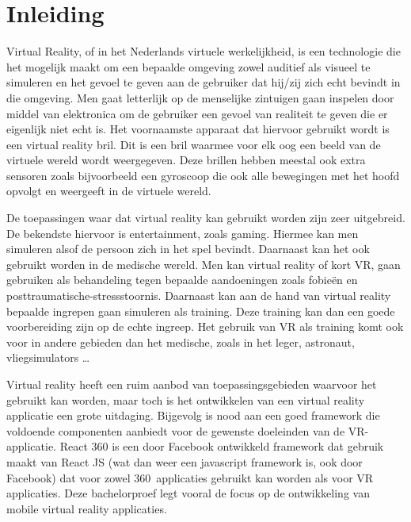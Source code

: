 
\chapter{Inleiding}
\label{ch:inleiding}
Virtual Reality, of in het Nederlands virtuele werkelijkheid, is een technologie die het mogelijk maakt om een bepaalde omgeving zowel auditief als visueel te simuleren en het gevoel te geven aan de gebruiker dat hij/zij zich echt bevindt in die omgeving. Men gaat letterlijk op de menselijke zintuigen gaan inspelen door middel van elektronica om de gebruiker een gevoel van realiteit te geven die er eigenlijk niet echt is. Het voornaamste apparaat dat hiervoor gebruikt wordt is een virtual reality bril. Dit is een bril waarmee voor elk oog een beeld van de virtuele wereld wordt weergegeven. Deze brillen hebben meestal ook extra sensoren zoals bijvoorbeeld een gyroscoop die ook alle bewegingen met het hoofd opvolgt en weergeeft in de virtuele wereld.

De toepassingen waar dat virtual reality kan gebruikt worden zijn zeer uitgebreid. De bekendste hiervoor is entertainment, zoals gaming. Hiermee kan men simuleren alsof de persoon zich in het spel bevindt. Daarnaast kan het ook gebruikt worden in de medische wereld. Men kan virtual reality of kort VR, gaan gebruiken als behandeling tegen bepaalde aandoeningen zoals fobieën en posttraumatische-stressstoornis. Daarnaast kan aan de hand van virtual reality bepaalde ingrepen gaan simuleren als training. Deze training kan dan een goede voorbereiding zijn op de echte ingreep. Het gebruik van VR als training komt ook voor in andere gebieden dan het medische, zoals in het leger, astronaut, vliegsimulators …

Virtual reality heeft een ruim aanbod van toepassingsgebieden waarvoor het gebruikt kan worden, maar toch is het ontwikkelen van een virtual reality applicatie een grote uitdaging. Bijgevolg is nood aan een goed framework die voldoende componenten aanbiedt voor de gewenste doeleinden van de VR-applicatie. React 360 is een door Facebook ontwikkeld framework dat gebruik maakt van React JS (wat dan weer een javascript framework is, ook door Facebook) dat voor zowel 360\textdegree\ applicaties gebruikt kan worden als voor VR applicaties. Deze bachelorproef legt vooral de focus op de ontwikkeling van mobile virtual reality applicaties.

